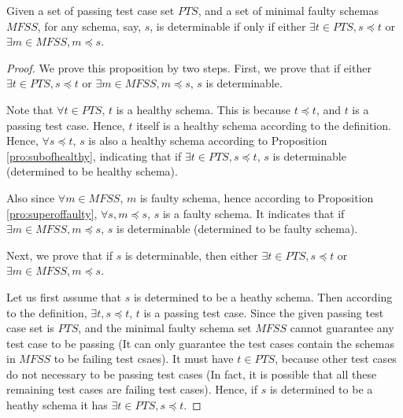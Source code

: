 

\begin{proposition}\label{pro:determinableparthealthyfaulty}
Given a set of passing test case set $PTS$, and a set of minimal faulty schemas $MFSS$, for any schema, say, $s$, is determinable if only if either $\exists t \in PTS, s \preceq t$ or $\exists m \in MFSS, m \preceq s$.
\end{proposition}

\begin{proof}

We prove this proposition by two steps. First, we prove that if either $\exists t \in PTS, s \preceq t$ or $\exists m \in MFSS, m \preceq s$, $s$ is determinable.

Note that $\forall t \in PTS$, $t$ is a healthy schema. This is because $t \preceq t$, and $t$ is a passing test case. Hence, $t$ itself is a healthy schema according to the definition. Hence, $\forall s \preceq t$, $s$ is also a healthy schema according to Proposition \ref{pro:subofhealthy}, indicating that if $\exists t \in PTS, s \preceq t$, $s$ is determinable (determined to be healthy schema).

Also since $\forall m \in MFSS$, $m$ is faulty schema, hence according to Proposition \ref{pro:superoffaulty}, $\forall s,  m \preceq s$, $s$ is a faulty schema. It indicates that if $\exists m \in MFSS, m \preceq s$, $s$ is determinable (determined to be faulty schema).



Next, we prove that if $s$ is determinable, then either $\exists t \in PTS, s \preceq t$ or $\exists m \in MFSS, m \preceq s$.

Let us first assume that $s$ is determined to be a heathy schema. Then according to the definition, $\exists t, s \preceq t$, $t$ is a passing test case. Since the given passing test case set is $PTS$, and the minimal faulty schema set $MFSS$ cannot guarantee any test case to be passing (It can only guarantee the test cases contain the schemas in $MFSS$ to be failing test csaes). It must have $t \in PTS$, because other test cases do not necessary to be passing test cases (In fact, it is possible that all these remaining test cases are failing test cases). Hence, if $s$ is determined to be a heathy schema it has $\exists t \in PTS, s \preceq t$.


\end{proof}
